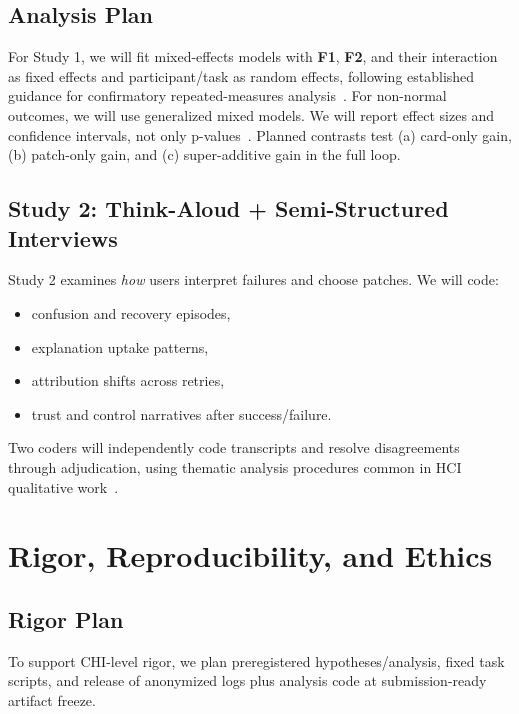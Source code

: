 \documentclass[sigconf,review,anonymous]{acmart}
\begin{document}
\subsection{Analysis Plan}
For Study 1, we will fit mixed-effects models with \textbf{F1}, \textbf{F2}, and their interaction as fixed effects and participant/task as random effects, following established guidance for confirmatory repeated-measures analysis~\cite{barr2013maximal}. For non-normal outcomes, we will use generalized mixed models. We will report effect sizes and confidence intervals, not only p-values~\cite{lakens2013effectsizes}. Planned contrasts test (a) card-only gain, (b) patch-only gain, and (c) super-additive gain in the full loop.

\subsection{Study 2: Think-Aloud + Semi-Structured Interviews}
Study 2 examines \emph{how} users interpret failures and choose patches. We will code:
\begin{itemize}
  \item confusion and recovery episodes,
  \item explanation uptake patterns,
  \item attribution shifts across retries,
  \item trust and control narratives after success/failure.
\end{itemize}
Two coders will independently code transcripts and resolve disagreements through adjudication, using thematic analysis procedures common in HCI qualitative work~\cite{braun2006thematic}.

\section{Rigor, Reproducibility, and Ethics}
\subsection{Rigor Plan}
To support CHI-level rigor, we plan preregistered hypotheses/analysis, fixed task scripts, and release of anonymized logs plus analysis code at submission-ready artifact freeze.
\end{document}
